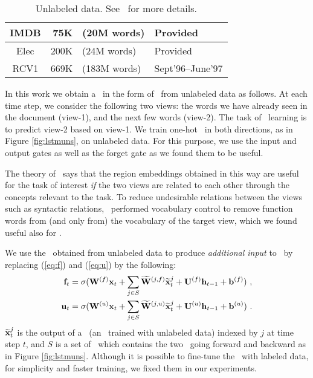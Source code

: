 \documentclass{article}
\begin{document}
\begin{table}[t]
\begin{center}
\begin{small}
\begin{tabular}{|c|rl|l|}   
\hline
IMDB & 75K &(20M words) & Provided \\
\hline
Elec & 200K &(24M words) & Provided \\
\hline
RCV1 & 669K &(183M words) & Sept'96--June'97 \\
\hline
\end{tabular}
\end{small}
\vskip -0.05in
\caption{ \label{tab:unlab} 
Unlabeled data.  See \JZb\ for more details. 
}
\end{center}
\end{table}
In this work
we obtain a \tvEmb\ in the form of \lstm\ from unlabeled data as follows. 
At each time step, we consider the following two views: the words we have already seen in the document (view-1), 
and the next few words (view-2).  The task of \tvEmb\ learning is 
to predict view-2 based on view-1.  We train one-hot \lstms\ in both directions, as in Figure \ref{fig:lstmuns}, 
on unlabeled data.  For this purpose, we use the input and output gates as well as the forget gate 
as we found them to be useful.  

The theory of \tvEmb\ says that 
the region embeddings obtained in this way are useful for the task of interest {\em if}
the two views are related to each other through the concepts relevant to the task. 
To reduce undesirable relations between the views such as syntactic relations, \JZb\ performed 
vocabulary control to remove function words from (and only from) 
the vocabulary of the target view, which we found useful also for \lstm.   

\newcommand{\embIdx}{j}
\newcommand{\embSet}{S}
We use the \tvEmbs\ obtained from unlabeled data to produce {\em additional input} to 
\lstm\ by replacing (\ref{eq:f}) and (\ref{eq:u}) by the following: 
\begin{align*}
\ff_t &= \squash(\Wx{f}\xx_t + \sum_{\embIdx\in\embSet} \Wtv{\embIdx,f}\xtv^{\embIdx}_t + \Wh{f}\hh_{t-1} + \bbb{f} )~, \\ \uu_t &= \squash(\Wx{u}\xx_t + \sum_{\embIdx\in\embSet} \Wtv{\embIdx,u}\xtv^{\embIdx}_t + \Wh{u}\hh_{t-1} + \bbb{u} )~.    \end{align*}
$\xtv^{\embIdx}_t$ is the output of a \tvEmb\ (an \lstm\ trained with unlabeled data)
indexed by $\embIdx$ at time step $t$, and 
$\embSet$ is a set of \tvEmbs\ which contains the two \lstms\ going forward and backward as in Figure \ref{fig:lstmuns}. 
Although it is possible to fine-tune the \tvEmbs\ with labeled data, for simplicity and faster training, 
we fixed them in our experiments. 
\end{document}
